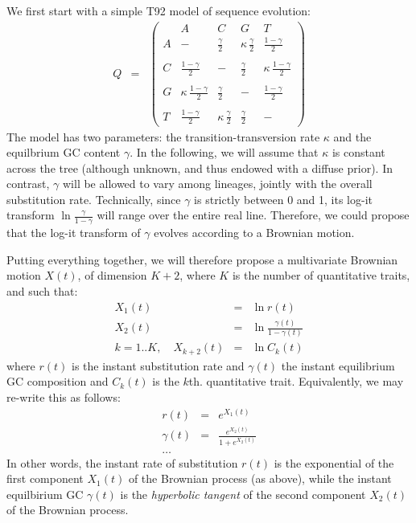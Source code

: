 \documentclass[usletter]{article}
\begin{document}
We first start with a simple T92 model of sequence evolution:
\begin{eqnarray*}
Q &=& 
\left( \begin{array}{r|rrrrr}
&A&C&G&T\\
\hline
A&- &  \frac{\gamma}{2}  & \kappa \, \frac{\gamma}{2} &  \frac{1 - \gamma}{2} \\
\\
C& \frac{1 - \gamma}{2} & - & \frac{\gamma}{2} & \kappa \, \frac{1 - \gamma}{2}  \\
\\
G&\kappa \, \frac{1 - \gamma}{2}  &  \frac{\gamma}{2}  & - & \frac{1 - \gamma}{2}  \\
\\
T& \frac{1 - \gamma}{2} & \kappa \, \frac{\gamma}{2}  &  \frac{\gamma}{2}  & -
\end{array} \right)
\end{eqnarray*}
The model has two parameters: the transition-transversion rate $\kappa$ and the equilbrium GC content $\gamma$. In the following, we will assume that $\kappa$ is constant across the tree (although unknown, and thus endowed with a diffuse prior). In contrast, $\gamma$ will be allowed to vary among lineages, jointly with the overall substitution rate.
Technically, since $\gamma$ is strictly between 0 and 1, its log-it transform $\ln \frac{\gamma}{1 - \gamma}$ will range over the entire real line. Therefore, we could propose that the log-it transform of $\gamma$ evolves according to a Brownian motion.

Putting everything together, we will therefore propose a multivariate Brownian motion $X(t)$, of dimension $K+2$, where $K$ is the number of quantitative traits, and such that:
\begin{eqnarray*}
X_1(t) &=& \ln r(t)
\\
X_2(t) &=& \ln \frac{\gamma(t)}{1 - \gamma(t)}
\\
k=1..K, \quad X_{k+2}(t) &=& \ln C_k(t)
\end{eqnarray*}
where $r(t)$ is the instant substitution rate and $\gamma(t)$ the instant equilibrium GC composition
and $C_k(t)$ is the $k$th. quantitative trait.
Equivalently, we may re-write this as follows:
\begin{eqnarray*}
r(t) &=& e^{X_1(t)}
\\
\gamma(t) &=& \frac{e^{X_2(t)}}{1 + e^{X_2(t)}}
\\
\ldots
\end{eqnarray*}
In other words, the instant rate of substitution $r(t)$ is the exponential of the first component $X_1(t)$ of the Brownian process (as above), while the instant equilbirium GC $\gamma(t)$ is the \emph{hyperbolic tangent} of the second component $X_2(t)$ of the Brownian process.
\end{document}
